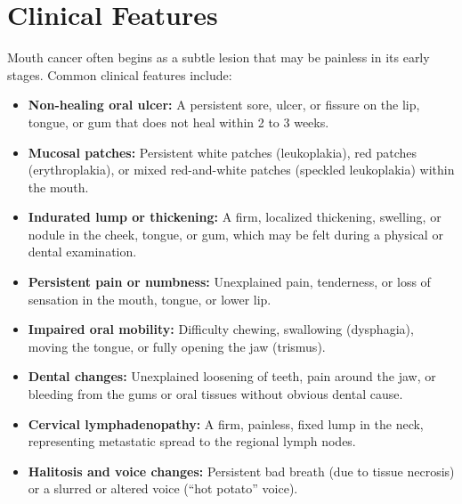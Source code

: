\section*{Clinical Features}
Mouth cancer often begins as a subtle lesion that may be painless in its early stages. Common clinical features include:
\begin{itemize}
    \item \textbf{Non-healing oral ulcer:} A persistent sore, ulcer, or fissure on the lip, tongue, or gum that does not heal within 2 to 3 weeks.
    \item \textbf{Mucosal patches:} Persistent white patches (leukoplakia), red patches (erythroplakia), or mixed red-and-white patches (speckled leukoplakia) within the mouth.
    \item \textbf{Indurated lump or thickening:} A firm, localized thickening, swelling, or nodule in the cheek, tongue, or gum, which may be felt during a physical or dental examination.
    \item \textbf{Persistent pain or numbness:} Unexplained pain, tenderness, or loss of sensation in the mouth, tongue, or lower lip.
    \item \textbf{Impaired oral mobility:} Difficulty chewing, swallowing (dysphagia), moving the tongue, or fully opening the jaw (trismus).
    \item \textbf{Dental changes:} Unexplained loosening of teeth, pain around the jaw, or bleeding from the gums or oral tissues without obvious dental cause.
    \item \textbf{Cervical lymphadenopathy:} A firm, painless, fixed lump in the neck, representing metastatic spread to the regional lymph nodes.
    \item \textbf{Halitosis and voice changes:} Persistent bad breath (due to tissue necrosis) or a slurred or altered voice (``hot potato'' voice).
\end{itemize}

